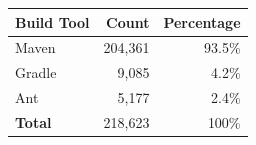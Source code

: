 \begin{tabular}{lrr}
\toprule
\textbf{Build Tool} & \textbf{Count} & \textbf{Percentage} \\
\midrule
Maven   & 204,361 & 93.5\% \\
Gradle  & 9,085   & 4.2\% \\
Ant     & 5,177   & 2.4\% \\
\midrule
\textbf{Total}   & 218,623 & 100\% \\
\bottomrule
\end{tabular}